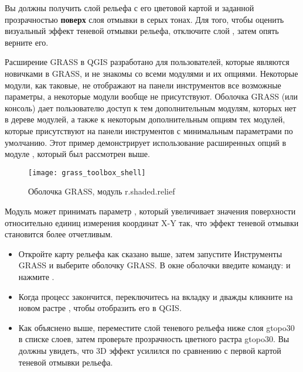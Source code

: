 Вы должны получить слой рельефа  с его цветовой
картой и заданной прозрачностью \textbf{поверх} слоя отмывки в серых
тонах. Для того, чтобы оценить визуальный эффект теневой отмывки
рельефа, отключите слой , затем опять верните
его.


Расширение GRASS в QGIS разработано для пользователей, которые являются
новичками в GRASS, и не знакомы со всеми модулями и их опциями. Некоторые
модули, как таковые, не отображают на панели инструментов все возможные
параметры, а некоторые модули вообще не присутствуют. Оболочка GRASS (или
консоль) дает пользователю доступ к тем дополнительным модулям, которых
нет в дереве модулей, а также к некоторым дополнительным опциям тех
модулей, которые присутствуют на панели инструментов с минимальным
параметрами по умолчанию. Этот пример демонстрирует использование
расширенных опций в модуле , который был
рассмотрен выше.

\begin{figure}[ht]
 \centering
 \texttt{[image: grass\_toolbox\_shell]}
 \caption{Оболочка GRASS, модуль r.shaded.relief \wincaption}\label{fig:grass_toolbox_shell}
\end{figure}

Модуль  может принимать параметр
, который увеличивает значения поверхности относительно
единиц измерения координат X-Y так, что эффект теневой отмывки становится
более отчетливым.

\begin{itemize}[label=--]
\item Откройте карту рельефа  как сказано выше,
затем запустите Инструменты GRASS и выберите оболочку GRASS. В окне
оболочки введите команду:\linebreak
{} \linebreak и нажмите .
\end{itemize}

\begin{itemize}[label=--]
\item Когда процесс закончится, переключитесь на вкладку 
и дважды кликните на новом растре , чтобы
отобразить его в QGIS.
\item Как объяснено выше, переместите слой теневого рельефа ниже слоя
gtopo30 в списке слоев, затем проверьте прозрачность цветного растра
gtopo30. Вы должны увидеть, что 3D эффект усилился по сравнению с
первой картой теневой отмывки рельефа.
\end{itemize}

